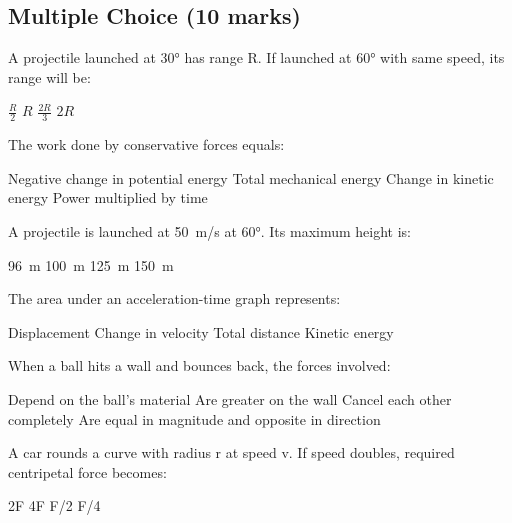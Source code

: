 \documentclass[addpoints]{exam}
\begin{document}
\newpage

\begin{questions}


\section*{Multiple Choice (10 marks)}
\vspace{5mm}

\question[1] A projectile launched at \ang{30} has range R. If launched at \ang{60} with same speed, its range will be:
    \begin{choices}
        \choice \( \frac{R}{2} \)
        \correctchoice \( R \)
        \choice \( \frac{2R}{3} \)
        \choice \( 2R \)
    \end{choices}
    
\question[1] The work done by conservative forces equals:
\begin{choices}
    \correctchoice Negative change in potential energy
    \choice Total mechanical energy
    \choice Change in kinetic energy
    \choice Power multiplied by time
\end{choices}


\question[1] A projectile is launched at \SI{50}{m/s} at \ang{60}. Its maximum height is:
\begin{choices}
    \correctchoice \SI{96}{m}
    \choice \SI{100}{m}
    \choice \SI{125}{m}
    \choice \SI{150}{m}
\end{choices}

\question[1] The area under an acceleration-time graph represents:
\begin{choices}
    \choice Displacement
    \correctchoice Change in velocity
    \choice Total distance
    \choice Kinetic energy
\end{choices}

\question[1] When a ball hits a wall and bounces back, the forces involved:
\begin{choices}
    \choice Depend on the ball's material
    \choice Are greater on the wall
    \choice Cancel each other completely
    \correctchoice Are equal in magnitude and opposite in direction
\end{choices}

\question[1] A car rounds a curve with radius r at speed v. If speed doubles, required centripetal force becomes:
\begin{choices}
    \choice 2F
    \correctchoice 4F
    \choice F/2
    \choice F/4
\end{choices}


\end{questions}
\end{document}
